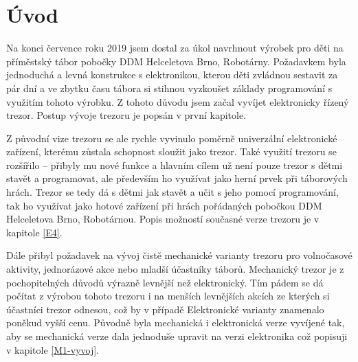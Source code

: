 \chapter{Úvod}

Na konci července roku 2019 jsem dostal za úkol navrhnout výrobek pro děti na příměstský tábor pobočky DDM Helceletova Brno, Robotárny. %
 Poža\-dav\-kem 
byla jednoduchá a levná konstrukce s elektronikou, kterou děti zvládnou sestavit za pár dní a ve zbytku času tábora si stihnou vyzkoušet základy programování 
s využitím tohoto výrobku. Z tohoto důvodu jsem začal vyvíjet elektronicky řízený trezor. Postup vývoje trezoru je popsán v první kapitole. %

Z původní vize trezoru se ale rychle vyvinulo poměrně univerzální elektronické zařízení, kterému zůstala schopnost sloužit jako trezor.
Také využití trezoru se rozšířilo -- přibyly mu nové funkce a hlavním cílem už není pouze trezor  s dětmi stavět a programovat, 
ale především ho využívat jako herní prvek při táborových hrách. 
Trezor se tedy dá s dětmi jak stavět a učit s jeho pomocí programování, tak ho využívat jako hotové zařízení při hrách pořádaných pobočkou DDM Helceletova Brno, Robotárnou.
Popis možností současné verze trezoru je v kapitole \ref{E4}.

Dále přibyl požadavek na vývoj čistě mechanické varianty trezoru pro volnočasové aktivity, jednorázové akce nebo mladší účastníky táborů.
Mechanický trezor je z pochopitelných důvodů výrazně levnější než elektronický. Tím pádem se dá počítat z výrobou tohoto trezoru i na menších levnějších akcích ze kterých 
si účastníci trezor odnesou, což by v případě Elektronické varianty znamenalo poněkud vyšší cenu.
Původně byla mechanická i elektronická verze vyvíjené tak, aby se mechanická verze dala jednoduše upravit na verzi elektronika což popisuji v kapitole \ref{M1-vyvoj}.



